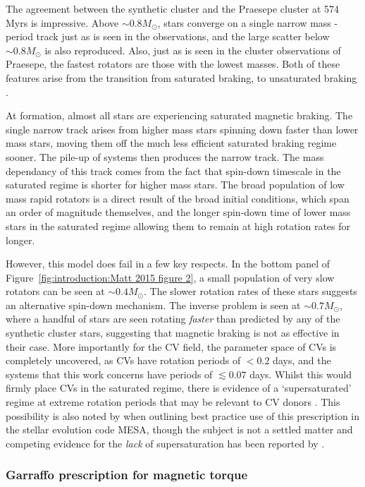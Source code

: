 The agreement between the synthetic cluster and the Praesepe cluster at 574 Myrs is impressive. Above $\sim 0.8 M_\odot$, stars converge on a single narrow mass - period track just as is seen in the observations, and the large scatter below $\sim 0.8 M_\odot$ is also reproduced. Also, just as is seen in the cluster observations of Praesepe, the fastest rotators are those with the lowest masses. Both of these features arise from the transition from saturated braking, to unsaturated braking \citep{matt2015}. 

At formation, almost all stars are experiencing saturated magnetic braking. The single narrow track arises from higher mass stars spinning down faster than lower mass stars, moving them off the much less efficient saturated braking regime sooner. The pile-up of systems then produces the narrow track. The mass dependancy of this track comes from the fact that spin-down timescale in the saturated regime is shorter for higher mass stars.
The broad population of low mass rapid rotators is a direct result of the broad initial conditions, which span an order of magnitude themselves, and the longer spin-down time of lower mass stars in the saturated regime allowing them to remain at high rotation rates for longer. 

However, this model does fail in a few key respects. In the bottom panel of Figure~\ref{fig:introduction:Matt 2015 figure 2}, a small population of very slow rotators can be seen at $\sim 0.4 M_\odot$. The slower rotation rates of these stars suggests an alternative spin-down mechanism. The inverse problem is seen at $\sim 0.7 M_\odot$, where a handful of stars are seen rotating {\it faster} than predicted by any of the synthetic cluster stars, suggesting that magnetic braking is not as effective in their case.
More importantly for the CV field, the parameter space of CVs is completely uncovered, as CVs have rotation periods of $< 0.2$ days, and the systems that this work concerns have periods of $\lesssim 0.07$ days. Whilst this would firmly place CVs in the saturated regime, there is evidence of a `supersaturated' regime at extreme rotation periods that may be relevant to CV donors \citep{James2000, Wright2011, Argiroffi2016}. This possibility is also noted by \citet{Gossage2021} when outlining best practice use of this prescription in the stellar evolution code MESA, though the subject is not a settled matter and competing evidence for the {\it lack} of supersaturation has been reported by \citet{jeffries2011}.


\subsubsection{Garraffo prescription for magnetic torque}
\label{sect:introduction:Garraffo magnetic braking prescription}

